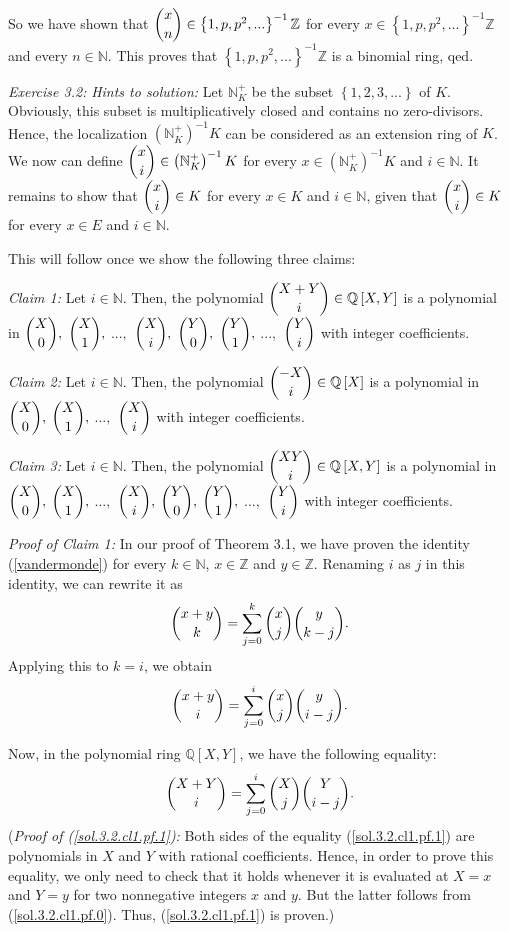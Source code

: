 \documentclass[numbers=enddot,12pt,final,onecolumn,notitlepage]{scrartcl}%
\begin{document}
So we have shown that $\dbinom{x}{n}\in\left\{  1,p,p^{2},...\right\}
^{-1}\mathbb{Z}$ for every $x\in\left\{  1,p,p^{2},...\right\}  ^{-1}%
\mathbb{Z}$ and every $n\in\mathbb{N}$. This proves that $\left\{
1,p,p^{2},...\right\}  ^{-1}\mathbb{Z}$ is a binomial ring, qed.

\textit{Exercise 3.2:} \textit{Hints to solution:} Let $\mathbb{N}_{K}^{+}$ be
the subset $\left\{  1,2,3,...\right\}  $ of $K$. Obviously, this subset is
multiplicatively closed and contains no zero-divisors. Hence, the localization
$\left(  \mathbb{N}_{K}^{+}\right)  ^{-1}K$ can be considered as an extension
ring of $K$. We now can define $\dbinom{x}{i}\in\left(  \mathbb{N}_{K}%
^{+}\right)  ^{-1}K$ for every $x\in\left(  \mathbb{N}_{K}^{+}\right)  ^{-1}K$
and $i\in\mathbb{N}$. It remains to show that $\dbinom{x}{i}\in K$ for every
$x\in K$ and $i\in\mathbb{N}$, given that $\dbinom{x}{i}\in K$ for every $x\in
E$ and $i\in\mathbb{N}$.

This will follow once we show the following three claims:

\textit{Claim 1:} Let $i\in\mathbb{N}$. Then, the polynomial $\dbinom{X+Y}%
{i}\in\mathbb{Q}\left[  X,Y\right]  $ is a polynomial in $\dbinom{X}{0},$
$\dbinom{X}{1},$ $...,$ $\dbinom{X}{i},$ $\dbinom{Y}{0},$ $\dbinom{Y}{1},$
$...,$ $\dbinom{Y}{i}$ with integer coefficients.

\textit{Claim 2:} Let $i\in\mathbb{N}$. Then, the polynomial $\dbinom{-X}%
{i}\in\mathbb{Q}\left[  X\right]  $ is a polynomial in $\dbinom{X}{0},$
$\dbinom{X}{1},$ $...,$ $\dbinom{X}{i}$ with integer coefficients.

\textit{Claim 3:} Let $i\in\mathbb{N}$. Then, the polynomial $\dbinom{XY}%
{i}\in\mathbb{Q}\left[  X,Y\right]  $ is a polynomial in $\dbinom{X}{0},$
$\dbinom{X}{1},$ $...,$ $\dbinom{X}{i},$ $\dbinom{Y}{0},$ $\dbinom{Y}{1},$
$...,$ $\dbinom{Y}{i}$ with integer coefficients.

\textit{Proof of Claim 1:} In our proof of Theorem 3.1, we have proven the
identity (\ref{vandermonde}) for every $k\in\mathbb{N}$, $x\in\mathbb{Z}$ and
$y\in\mathbb{Z}$. Renaming $i$ as $j$ in this identity, we can rewrite it as%
\[
\dbinom{x+y}{k}=\sum_{j=0}^{k}\dbinom{x}{j}\dbinom{y}{k-j}.
\]
Applying this to $k=i$, we obtain%
\begin{equation}
\dbinom{x+y}{i}=\sum_{j=0}^{i}\dbinom{x}{j}\dbinom{y}{i-j}.
\label{sol.3.2.cl1.pf.0}%
\end{equation}


Now, in the polynomial ring $\mathbb{Q}\left[  X,Y\right]  $, we have the
following equality:%
\begin{equation}
\dbinom{X+Y}{i}=\sum_{j=0}^{i}\dbinom{X}{j}\dbinom{Y}{i-j}.
\label{sol.3.2.cl1.pf.1}%
\end{equation}
(\textit{Proof of (\ref{sol.3.2.cl1.pf.1}):} Both sides of the equality
(\ref{sol.3.2.cl1.pf.1}) are polynomials in $X$ and $Y$ with rational
coefficients. Hence, in order to prove this equality, we only need to check
that it holds whenever it is evaluated at $X=x$ and $Y=y$ for two nonnegative
integers $x$ and $y$. But the latter follows from (\ref{sol.3.2.cl1.pf.0}).
Thus, (\ref{sol.3.2.cl1.pf.1}) is proven.)
\end{document}
